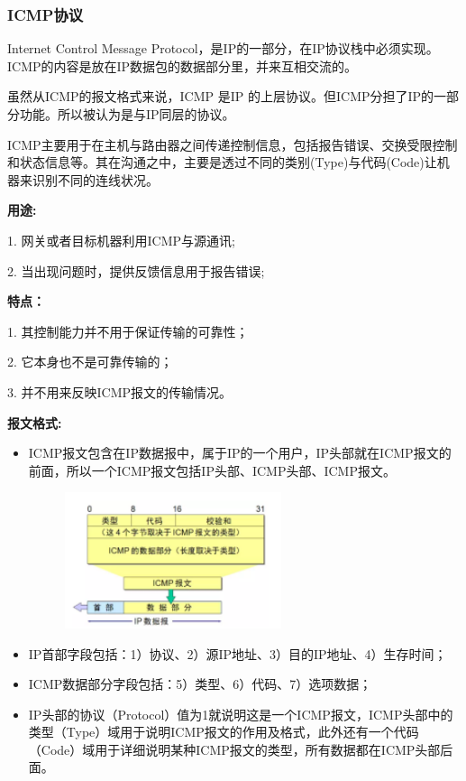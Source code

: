 \documentclass[UTF8]{article}%
\begin{document}
\subsubsection{ICMP协议}

Internet Control Message Protocol，是IP的一部分，在IP协议栈中必须实现。ICMP的内容是放在IP数据包的数据部分里，并来互相交流的。

虽然从ICMP的报文格式来说，ICMP 是IP 的上层协议。但ICMP分担了IP的一部分功能。所以被认为是与IP同层的协议。

ICMP主要用于在主机与路由器之间传递控制信息，包括报告错误、交换受限控制和状态信息等。其在沟通之中，主要是透过不同的类别(Type)与代码(Code)让机器来识别不同的连线状况。

\textbf{用途:}

1. 网关或者目标机器利用ICMP与源通讯;

2. 当出现问题时，提供反馈信息用于报告错误;

\textbf{特点：}

1. 其控制能力并不用于保证传输的可靠性；

2. 它本身也不是可靠传输的；

3. 并不用来反映ICMP报文的传输情况。

\textbf{报文格式:}
\begin{itemize}
    \item ICMP报文包含在IP数据报中，属于IP的一个用户，IP头部就在ICMP报文的前面，所以一个ICMP报文包括IP头部、ICMP头部、ICMP报文。
    
    \begin{figure}[htb!]%
        \includegraphics[width=0.6\textwidth]{1.7-1.png}
    \end{figure}

    \item IP首部字段包括：1）协议、2）源IP地址、3）目的IP地址、4）生存时间；
    \item ICMP数据部分字段包括：5）类型、6）代码、7）选项数据；
    \item IP头部的协议（Protocol）值为1就说明这是一个ICMP报文，ICMP头部中的类型（Type）域用于说明ICMP报文的作用及格式，此外还有一个代码（Code）域用于详细说明某种ICMP报文的类型，所有数据都在ICMP头部后面。
\end{itemize}
\end{document}
